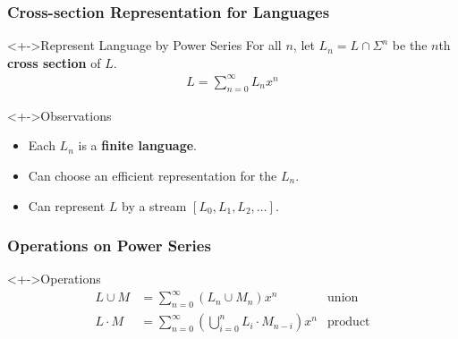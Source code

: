 \documentclass[pdftex,aspectratio=169]{beamer}
\begin{document}
\begin{frame}
  \frametitle{Cross-section Representation for Languages}
  \vspace{-\baselineskip}
  \begin{block}<+->{Represent Language by Power Series}
    For all $n$, let
    $L_n = L \cap \Sigma^n$ be the $n$th \textbf{cross section} of $L$.
    \begin{gather*}
      L = \sum_{n=0}^\infty L_nx^n
    \end{gather*}
  \end{block}
  \begin{block}<+->{Observations}
    \begin{itemize}
    \item Each $L_n$ is a \textbf{finite language}.
    \item Can choose an efficient representation for the $L_n$.
    \item Can represent $L$ by a stream $[L_0, L_1, L_2, \dots ]$.
    \end{itemize}
  \end{block}
\end{frame}
\begin{frame}
  \frametitle{Operations on Power Series}
\begin{block}<+->{Operations}
  \vspace{-\baselineskip}
    \begin{align*}
      L \cup M & = \sum_{n=0}^\infty (L_n \cup M_n)x^n & \text{union}\\
      L \cdot M &= \sum_{n=0}^\infty (\bigcup_{i=0}^n L_i \cdot M_{n-i})x^n & \text{product}
    \end{align*}
  \end{block}
\end{frame}
\end{document}
